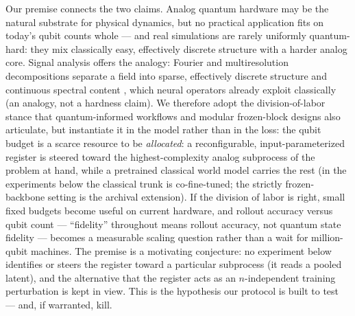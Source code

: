 \documentclass{article}
\begin{document}
Our premise connects the two claims. Analog quantum hardware may be the
natural substrate for physical dynamics, but no practical application fits
on today's qubit counts whole --- and real simulations are rarely uniformly
quantum-hard: they mix classically easy, effectively discrete structure with
a harder analog core. Signal analysis offers the analogy: Fourier and multiresolution
decompositions separate a field into sparse, effectively discrete
structure and continuous spectral content
\citep{mallat1989multiresolution,daubechies1992ten}, which neural operators
already exploit classically \citep{li2021fno} (an analogy, not a hardness claim). We therefore adopt the division-of-labor stance that quantum-informed
workflows \citep{wang2026qprior} and modular frozen-block designs
\citep{qi2026lego} also articulate, but instantiate it in the model rather
than in the loss: the qubit budget is a scarce resource to be
\emph{allocated}: a reconfigurable, input-parameterized
register is steered toward the highest-complexity analog subprocess of the
problem at hand, while a pretrained classical world model carries the rest
(in the experiments below the classical trunk is co-fine-tuned; the
strictly frozen-backbone setting is the archival extension). If the
division of labor is right, small fixed budgets become useful on current
hardware, and rollout accuracy versus qubit count --- ``fidelity''
throughout means rollout accuracy, not quantum state fidelity --- becomes a
measurable scaling question rather than a wait for million-qubit machines.
The premise is a motivating conjecture: no experiment below identifies or
steers the register toward a particular subprocess (it reads a pooled
latent), and the alternative that the register acts as an
$n$-independent training perturbation is kept in view. This is the
hypothesis our protocol is built to test --- and, if warranted, kill.
\end{document}
